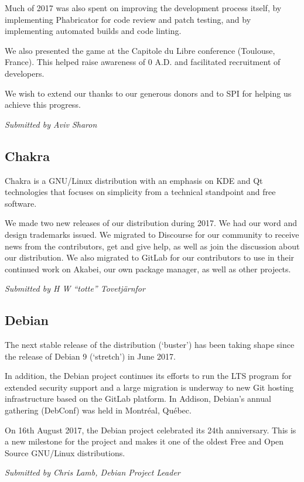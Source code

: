 \documentclass[a4paper]{report}
\begin{document}
Much of 2017 was also spent on improving the development process itself,
by implementing Phabricator for code review and patch testing, and by
implementing automated builds and code linting.

We also presented the game at the Capitole du Libre conference
(Toulouse, France). This helped raise awareness of 0 A.D. and
facilitated recruitment of developers.

We wish to extend our thanks to our generous donors and to SPI for
helping us achieve this progress.

{\em Submitted by Aviv Sharon}

\subsection{Chakra}

Chakra is a GNU/Linux distribution with an emphasis on KDE and Qt
technologies that focuses on simplicity from a technical standpoint and
free software.

We made two new releases of our distribution during 2017. We had our
word and design trademarks issued. We migrated to Discourse for our
community to receive news from the contributors, get and give help, as
well as join the discussion about our distribution. We also migrated to
GitLab for our contributors to use in their continued work on Akabei,
our own package manager, as well as other projects.

{\em Submitted by H W ``totte'' Tovetjärnfor}

\subsection{Debian}

The next stable release of the distribution (`buster') has been taking
shape since the release of Debian 9 (`stretch') in June 2017.

In addition, the Debian project continues its efforts to run the LTS
program for extended security support and a large migration is underway
to new Git hosting infrastructure based on the GitLab platform. In
Addison, Debian's annual gathering (DebConf) was held in Montréal,
Québec.

On 16th August 2017, the Debian project celebrated its 24th anniversary.
This is a new milestone for the project and makes it one of the oldest
Free and Open Source GNU/Linux distributions.

{\em Submitted by Chris Lamb, Debian Project Leader}
\end{document}
